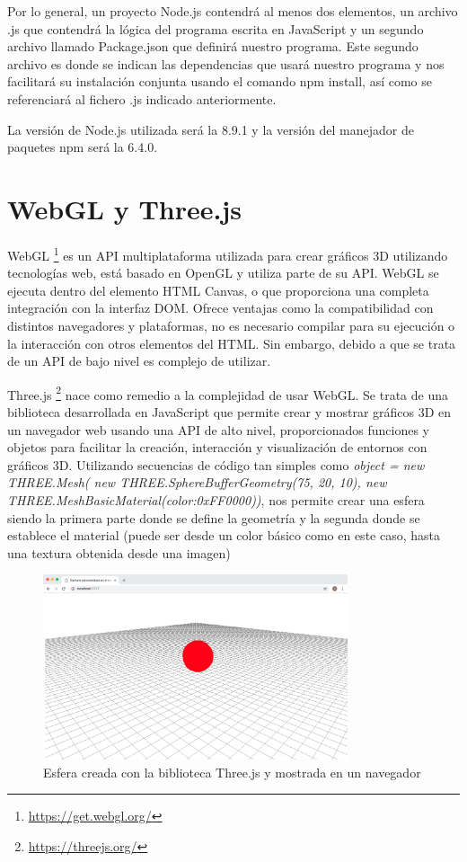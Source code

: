 Por lo general, un proyecto Node.js contendrá al menos dos elementos, un archivo .js que contendrá la lógica del programa escrita en JavaScript y un segundo archivo llamado Package.json que definirá nuestro programa. Este segundo archivo es donde se indican las dependencias que usará nuestro programa y nos facilitará su instalación conjunta usando el comando npm install, así como se referenciará al fichero .js indicado anteriormente.

La versión de Node.js utilizada será la 8.9.1 y la versión del manejador de paquetes npm será la 6.4.0.

\section{WebGL y Three.js}
WebGL \footnote{\url{https://get.webgl.org/}}  es un API multiplataforma utilizada para crear gráficos 3D utilizando tecnologías web, está basado en OpenGL y utiliza parte de su API. WebGL se ejecuta dentro del elemento HTML Canvas, o que proporciona una completa integración con la interfaz DOM. Ofrece ventajas como la compatibilidad con distintos navegadores y plataformas, no es necesario compilar para su ejecución o la interacción con otros elementos del HTML. Sin embargo, debido a que se trata de un API de bajo nivel es complejo de utilizar.

Three.js \footnote{\url{https://threejs.org/}} nace como remedio a la complejidad de usar WebGL. Se trata de una biblioteca desarrollada en JavaScript que permite crear y mostrar gráficos 3D en un navegador web usando una API de alto nivel, proporcionados funciones y objetos para facilitar la creación, interacción y visualización de entornos con gráficos 3D. Utilizando secuencias de código tan simples como \textsl{object = new THREE.Mesh( new THREE.SphereBufferGeometry(75, 20, 10), new THREE.MeshBasicMaterial({color:0xFF0000}))}, nos permite crear una esfera siendo la primera parte donde se define la geometría y la segunda donde se establece el material (puede ser desde un color básico como en este caso, hasta una textura obtenida desde una imagen)

\begin{figure}[H]
  \begin{center}
    \includegraphics[width=0.8\textwidth]{figures/esferathreejs.png}
		\caption{Esfera creada con la biblioteca Three.js y mostrada en un navegador}
		\label{fig.esferathreejs}
		\end{center}
\end{figure}

